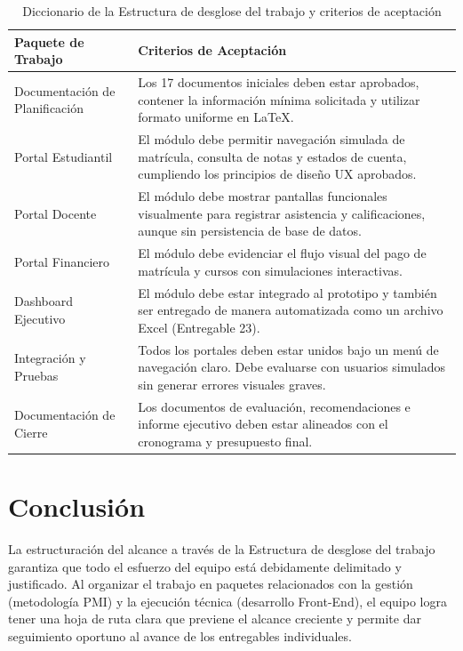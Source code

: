 \documentclass[11pt,spanish]{article}
\begin{document}
\begin{table}[H]
\centering
\caption{Diccionario de la Estructura de desglose del trabajo y criterios de aceptación}
\label{tab:wbs-diccionario}
{\small
\begin{tabularx}{\textwidth}{p{3.5cm} Y}
\toprule
\textbf{Paquete de Trabajo} & \textbf{Criterios de Aceptación} \\
\midrule
Documentación de Planificación & Los 17 documentos iniciales deben estar aprobados, contener la información mínima solicitada y utilizar formato uniforme en LaTeX. \\
\midrule
Portal Estudiantil & El módulo debe permitir navegación simulada de matrícula, consulta de notas y estados de cuenta, cumpliendo los principios de diseño UX aprobados. \\
\midrule
Portal Docente & El módulo debe mostrar pantallas funcionales visualmente para registrar asistencia y calificaciones, aunque sin persistencia de base de datos. \\
\midrule
Portal Financiero & El módulo debe evidenciar el flujo visual del pago de matrícula y cursos con simulaciones interactivas. \\
\midrule
Dashboard Ejecutivo & El módulo debe estar integrado al prototipo y también ser entregado de manera automatizada como un archivo Excel (Entregable 23). \\
\midrule
Integración y Pruebas & Todos los portales deben estar unidos bajo un menú de navegación claro. Debe evaluarse con usuarios simulados sin generar errores visuales graves. \\
\midrule
Documentación de Cierre & Los documentos de evaluación, recomendaciones e informe ejecutivo deben estar alineados con el cronograma y presupuesto final. \\
\bottomrule
\end{tabularx}
}
\end{table}

\section{Conclusión}

La estructuración del alcance a través de la Estructura de desglose del trabajo garantiza que todo el esfuerzo del equipo está debidamente delimitado y justificado. Al organizar el trabajo en paquetes relacionados con la gestión (metodología PMI) y la ejecución técnica (desarrollo Front-End), el equipo logra tener una hoja de ruta clara que previene el alcance creciente y permite dar seguimiento oportuno al avance de los entregables individuales.
\end{document}

